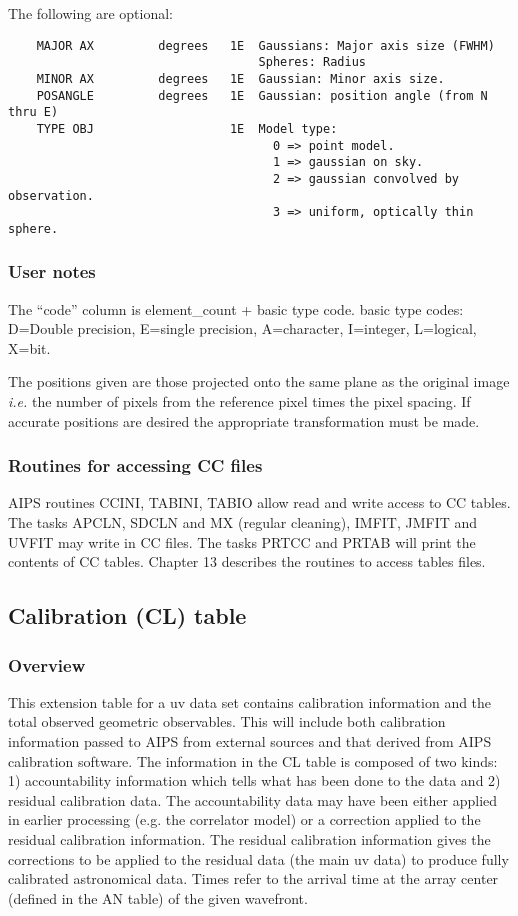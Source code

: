    The following are optional:

\begin{verbatim}
    MAJOR AX         degrees   1E  Gaussians: Major axis size (FWHM)
                                   Spheres: Radius
    MINOR AX         degrees   1E  Gaussian: Minor axis size.
    POSANGLE         degrees   1E  Gaussian: position angle (from N thru E)
    TYPE OBJ                   1E  Model type:
                                     0 => point model.
                                     1 => gaussian on sky.
                                     2 => gaussian convolved by observation.
                                     3 => uniform, optically thin sphere.
\end{verbatim}
\subsubsection{User notes}
  The ``code'' column is element\_count + basic type code.
basic type codes: D=Double precision, E=single precision, A=character,
I=integer, L=logical, X=bit.

     The positions given are those projected onto the same plane as
the original image {\it i.e.} the number of pixels from the reference
pixel times the pixel spacing.  If accurate positions are desired the
appropriate transformation must be made.


\subsubsection{Routines for accessing CC files}
AIPS routines CCINI, TABINI,
TABIO allow read and write access to CC tables.  The
tasks APCLN, SDCLN and MX (regular cleaning), IMFIT, JMFIT and UVFIT
may write in CC files.  The tasks PRTCC and PRTAB will print the
contents of CC tables.  Chapter 13 describes the routines to access
tables files.

\subsection{Calibration (CL) table}

\subsubsection{Overview}

   This extension table for a uv data set contains calibration
information and the total observed geometric observables.  This will
include both calibration information passed to AIPS from external
sources and that derived from AIPS calibration software.  
The information in the CL table is composed of two kinds: 1)
accountability  information which tells what has been 
done to the data and 2) residual calibration data.  The accountability
data may have been either applied in earlier processing (e.g. the
correlator model) or a correction applied to the residual calibration
information.  The residual calibration information gives the
corrections to be applied to the residual data (the main uv data) to
produce fully calibrated astronomical data.  Times refer to the
arrival time at the array center (defined in the AN table) of the
given wavefront. 

